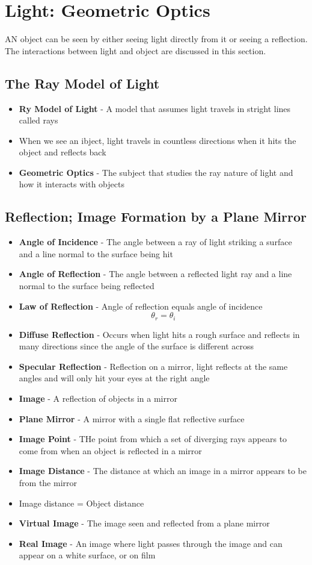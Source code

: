 \section{Light: Geometric Optics}
AN object can be seen by either seeing light directly from it or seeing a reflection. The interactions between light and object are discussed in this section.

\subsection{The Ray Model of Light}
\begin{itemize}
    \item \textbf{Ry Model of Light} - A model that assumes light travels in stright lines called rays
	\item When we see an ibject, light travels in countless directions when it hits the object and reflects back
	\item \textbf{Geometric Optics} - The subject that studies the ray nature of light and how it interacts with objects
\end{itemize}

\subsection{Reflection; Image Formation by a Plane Mirror}
\begin{itemize}
    \item \textbf{Angle of Incidence} - The angle between a ray of light striking a surface and a line normal to the surface being hit
    \item \textbf{Angle of Reflection} - The angle between a reflected light ray and a line normal to the surface being reflected
    \item \textbf{Law of Reflection} - Angle of reflection equals angle of incidence \[\theta_r=\theta_i\]
    \item \textbf{Diffuse Reflection} - Occurs when light hits a rough surface and reflects in many directions since the angle of the surface is different across
    \item \textbf{Specular Reflection} - Reflection on a mirror, light reflects at the same angles and will only hit your eyes at the right angle
    \item \textbf{Image} - A reflection of objects in a mirror
    \item \textbf{Plane Mirror} - A mirror with a single flat reflective surface
    \item \textbf{Image Point} - THe point from which a set of diverging rays appears to come from when an object is reflected in a mirror
    \item \textbf{Image Distance} - The distance at which an image in a mirror appears to be from the mirror
    \item Image distance = Object distance
    \item \textbf{Virtual Image} - The image seen and reflected from a plane mirror
    \item \textbf{Real Image} - An image where light passes through the image and can appear on a white surface, or on film
\end{itemize}

